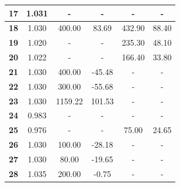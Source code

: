 \documentclass{article}
\begin{document}
\begin{table}[H]
\begin{tabular}{|c|c|c|c|c|c|}
\textbf{17}  & 1.031   & -               & -             & -            & -           \\ \hline
\textbf{18}  & 1.030   & 400.00          & 83.69         & 432.90       & 88.40       \\ \hline
\textbf{19}  & 1.020   & -               & -             & 235.30       & 48.10       \\ \hline
\textbf{20}  & 1.022   & -               & -             & 166.40       & 33.80       \\ \hline
\textbf{21}  & 1.030   & 400.00          & -45.48        & -            & -           \\ \hline
\textbf{22}  & 1.030   & 300.00          & -55.68        & -            & -           \\ \hline
\textbf{23}  & 1.030   & 1159.22         & 101.53        & -            & -           \\ \hline
\textbf{24}  & 0.983   & -               & -             & -            & -           \\ \hline
\textbf{25}  & 0.976   & -               & -             & 75.00        & 24.65       \\ \hline
\textbf{26}  & 1.030   & 100.00          & -28.18        & -            & -           \\ \hline
\textbf{27}           & 1.030   & 80.00           & -19.65        & -            & -           \\ \hline
\textbf{28}           & 1.035   & 200.00          & -0.75         & -            & -           \\ \hline
\end{tabular}
\end{table}
\end{document}

